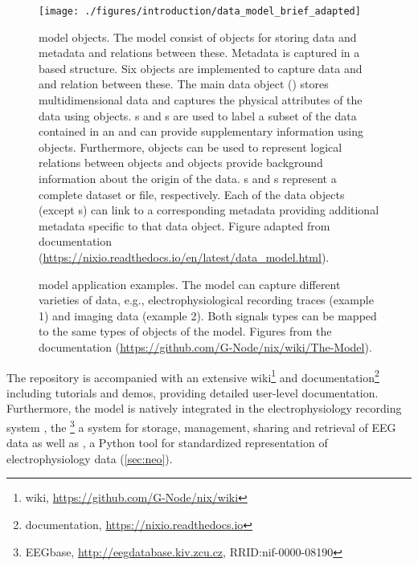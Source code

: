 \begin{figure}
 \texttt{[image: ./figures/introduction/data\_model\_brief\_adapted]}
 \caption[ model objects]{ model objects. The model consist of objects for storing data and metadata and relations between these. Metadata is captured in a  based structure. Six objects are implemented to capture data and and relation between these. The main data object () stores multidimensional data and captures the physical attributes of the data using  objects. s and s are used to label a subset of the data contained in an  and can provide supplementary information using  objects. Furthermore,  objects can be used to represent logical relations between objects and  objects provide background information about the origin of the data. s and s represent a complete dataset or file, respectively. Each of the data objects (except s) can link to a corresponding metadata  providing additional metadata specific to that data object. Figure adapted from  documentation (\url{https://nixio.readthedocs.io/en/latest/data_model.html}).}
 \label{fig:intro_nix_model}
\end{figure}

\begin{figure}
 \centering
 \scalebox{0.45}{
 }
 \caption[ model application examples]{ model application examples. The model can capture different varieties of data, e.g., electrophysiological recording traces (example 1) and imaging data (example 2). Both signals types can be mapped to the same types of objects of the  model. Figures from  the documentation (\url{https://github.com/G-Node/nix/wiki/The-Model}).}
 \label{fig:intro_nix_examples}
\end{figure}

The  repository is accompanied with an extensive wiki\footnote{ wiki, \url{https://github.com/G-Node/nix/wiki}} and documentation\footnote{ documentation, \url{https://nixio.readthedocs.io}} including tutorials and demos, providing detailed user-level documentation. Furthermore, the  model is natively integrated in the electrophysiology recording system , the \footnote{EEGbase, \url{http://eegdatabase.kiv.zcu.cz}, RRID:nif-0000-08190} a system for storage, management, sharing and retrieval of EEG data as well as , a Python tool for standardized representation of electrophysiology data (\cref{sec:neo}).







